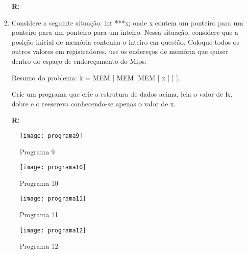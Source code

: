 \documentclass[a4paper,11pt]{article}
\begin{document}
\begin{enumerate}
        \textbf{R: }
        
        \newpage
    \item{Considere a seguinte situação:\newline
            int ***x;\newline
            onde x contem um ponteiro para um ponteiro para um ponteiro para um inteiro.\newline 
            Nessa situação, considere que a posição inicial de memória contenha o inteiro em questão.
            Coloque todos os outros valores em registradores, use os endereços de memória que quiser 
            dentro do espaço de endereçamento do Mips.

            Resumo do problema:\newline
            k = MEM [ MEM [MEM [  x ] ] ].

            Crie um programa que crie a estrutura de dados acima, leia o  valor de K, dobre e 
            o reescreva conhecendo-se apenas o valor de x.}

        \textbf{R:}
        
\end{enumerate}

\newpage
\begin{figure}[!ht]
    \caption{Programa 9}
    \centering
    \texttt{[image: programa9]}
\end{figure}
\begin{figure}[!ht]
    \caption{Programa 10}
    \centering
    \texttt{[image: programa10]}
\end{figure}
\begin{figure}[!ht]
    \caption{Programa 11}
    \centering
    \texttt{[image: programa11]}
\end{figure} 
\begin{figure}[!ht]
    \caption{Programa 12}
    \centering
    \texttt{[image: programa12]}
\end{figure} 
\end{document}
